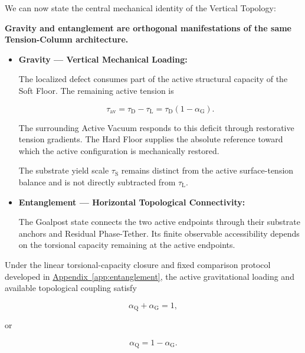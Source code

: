 We can now state the central mechanical identity of the Vertical Topology:

\textbf{Gravity and entanglement are orthogonal manifestations of the same Tension-Column architecture.}

\begin{itemize}

    \item \textbf{Gravity --- Vertical Mechanical Loading:}

    The localized defect consumes part of the active structural capacity of the Soft Floor. The remaining active tension is

    \begin{equation}
        \tau_{\mathrm{av}}
        =
        \tau_{\mathrm D}
        -
        \tau_{\mathrm L}
        =
        \tau_{\mathrm D}
        (1-\alpha_{\mathrm G}).
        \label{eq:active_tension_deficit}
    \end{equation}

    The surrounding Active Vacuum responds to this deficit through restorative tension gradients. The Hard Floor supplies the absolute reference toward which the active configuration is mechanically restored.

    The substrate yield scale $\tau_{\mathrm S}$ remains distinct from the active surface-tension balance and is not directly subtracted from $\tau_{\mathrm L}$.

    \item \textbf{Entanglement --- Horizontal Topological Connectivity:}

    The Goalpost state connects the two active endpoints through their substrate anchors and Residual Phase-Tether. Its finite observable accessibility depends on the torsional capacity remaining at the active endpoints.

\end{itemize}

Under the linear torsional-capacity closure and fixed comparison protocol developed in
\hyperref[app:entanglement]{Appendix~\ref*{app:entanglement}},
the active gravitational loading and available topological coupling satisfy

\begin{equation}
    \alpha_{\mathrm Q}
    +
    \alpha_{\mathrm G}
    =
    1,
\end{equation}

or

\begin{equation}
    \alpha_{\mathrm Q}
    =
    1-\alpha_{\mathrm G}.
    \label{eq:gravity_entanglement_budget}
\end{equation}

